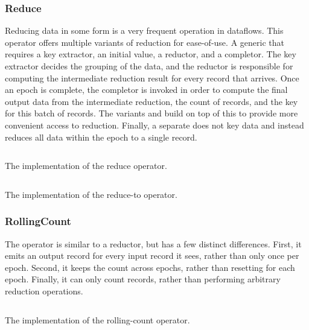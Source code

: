\subsubsection{Reduce}
Reducing data in some form is a very frequent operation in dataflows. This operator offers multiple variants of reduction for ease-of-use. A generic  that requires a key extractor, an initial value, a reductor, and a completor. The key extractor decides the grouping of the data, and the reductor is responsible for computing the intermediate reduction result for every record that arrives. Once an epoch is complete, the completor is invoked in order to compute the final output data from the intermediate reduction, the count of records, and the key for this batch of records. The variants  and  build on top of this to provide more convenient access to reduction. Finally, a separate  does not key data and instead reduces all data within the epoch to a single record.

\begin{listing}[H]
  \inputminted[firstline=37,lastline=65]{rust}{benchmarks/src/operators/reduce.rs}
  \caption{The implementation of the reduce operator.}
  \label{lst:reduce}
\end{listing}

\begin{listing}[H]
  \inputminted[firstline=83,lastline=103]{rust}{benchmarks/src/operators/reduce.rs}
  \caption{The implementation of the reduce-to operator.}
  \label{lst:reduce-to}
\end{listing}

\subsubsection{RollingCount}
The  operator is similar to a reductor, but has a few distinct differences. First, it emits an output record for every input record it sees, rather than only once per epoch. Second, it keeps the count across epochs, rather than resetting for each epoch. Finally, it can only count records, rather than performing arbitrary reduction operations.

\begin{listing}[H]
  \inputminted[firstline=19,lastline=38]{rust}{benchmarks/src/operators/rollingcount.rs}
  \caption{The implementation of the rolling-count operator.}
  \label{lst:rolling-count}
\end{listing}

